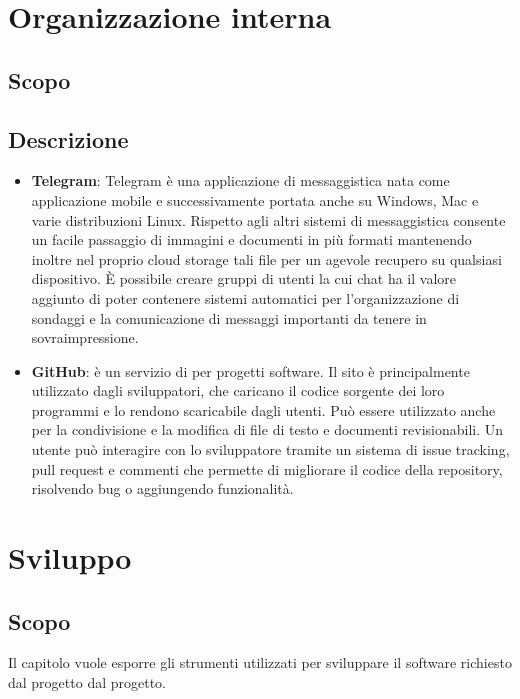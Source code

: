 \documentclass[openany,12pt,a4paper]{report}
\begin{document}

\chapter{Organizzazione interna}

\section{Scopo}

\section{Descrizione}
	
	\begin{itemize}
	    \item \textbf{Telegram}: Telegram è una applicazione di messaggistica nata come applicazione mobile e successivamente portata anche su Windows, Mac e varie distribuzioni Linux. Rispetto agli altri sistemi di messaggistica  consente un facile passaggio di immagini e documenti in più formati mantenendo inoltre nel proprio cloud storage tali file per un agevole recupero su qualsiasi dispositivo. È possibile creare gruppi di utenti la cui chat ha il valore aggiunto di poter contenere sistemi automatici per l'organizzazione di sondaggi e la comunicazione di messaggi importanti da tenere in sovraimpressione.
	    
	    \item \textbf{GitHub}: è un servizio di  per progetti software. Il sito è principalmente utilizzato dagli sviluppatori, che caricano il codice sorgente dei loro programmi e lo rendono scaricabile dagli utenti. Può essere utilizzato anche per la condivisione e la modifica di file di testo e documenti revisionabili. Un utente può interagire con lo sviluppatore tramite un sistema di issue tracking, pull request e commenti che permette di migliorare il codice della repository, risolvendo bug o aggiungendo funzionalità.
	\end{itemize}


\chapter{Sviluppo}

\section{Scopo}
Il capitolo vuole esporre gli strumenti utilizzati per sviluppare il software richiesto dal progetto dal progetto. 
\end{document}
